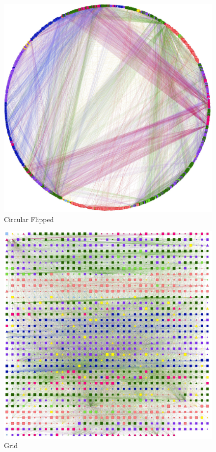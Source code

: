 \begin{figure}[p]
\centering
\includegraphics[height=0.45\textheight]{img/oot/circular_flipped}
\caption{Circular Flipped}\label{fig:oot:circleflip}
\end{figure}

\begin{figure}[p]
\centering
\includegraphics[height=0.45\textheight]{img/oot/grid}
\caption{Grid}\label{fig:oot:grid}
\end{figure}
